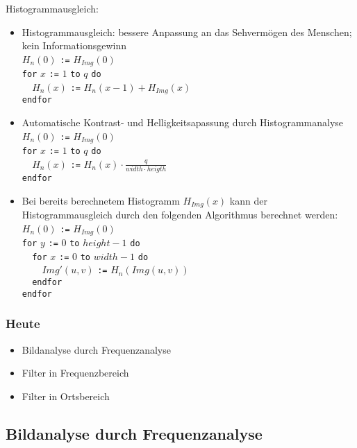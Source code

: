 Histogrammausgleich:
\begin{itemize}
\item Histogrammausgleich: bessere Anpassung an das Sehvermögen des Menschen; kein Informationsgewinn \\
$H_n(0)$ \verb|:=| $H_{Img}(0)$ \\
\verb|for| $x$ \verb|:=| $1$ \verb|to| $q$ \verb|do| \\
\verb|  |$H_n(x)$ \verb|:=| $H_n(x-1) + H_{Img}(x)$ \\
\verb|endfor|
\item Automatische Kontrast- und Helligkeitsapassung durch Histogrammanalyse \\
$H_n(0)$ \verb|:=| $H_{Img}(0)$ \\
\verb|for| $x$ \verb|:=| $1$ \verb|to| $q$ \verb|do| \\
\verb|  |$H_n(x)$ \verb|:=| $H_n(x) \cdot \frac{q}{width \cdot heigth}$ \\
\verb|endfor|
\item Bei bereits berechnetem Histogramm $H_{Img}(x)$ kann der Histogrammausgleich durch den folgenden Algorithmus berechnet werden: \\
$H_n(0)$ \verb|:=| $H_{Img}(0)$ \\
\verb|for| $y$ \verb|:=| $0$ \verb|to| $height - 1$ \verb|do| \\
\verb|  for| $x$ \verb|:=| $0$ \verb|to| $width-1$ \verb|do| \\
\verb|    | $Img'(u,v)$ \verb|:=| $H_n(Img(u,v))$ \\
\verb|  endfor| \\
\verb|endfor|
\end{itemize}

\subsubsection*{Heute}

\begin{itemize}
\item Bildanalyse durch Frequenzanalyse
\item Filter in Frequenzbereich
\item Filter in Ortsbereich
\end{itemize}

\subsection{Bildanalyse durch Frequenzanalyse}

